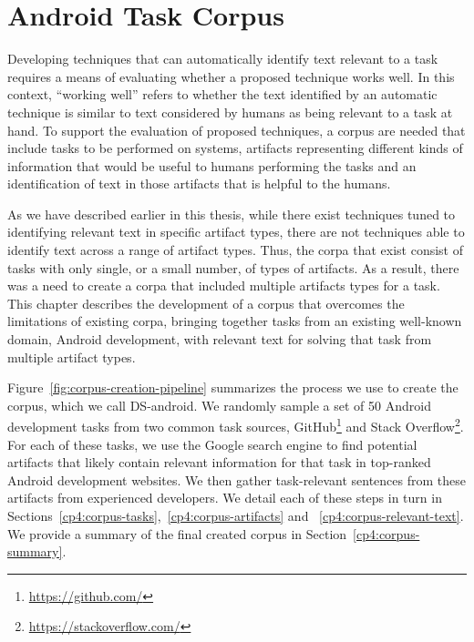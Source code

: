 \setcounter{chapter}{3}
\setcounter{rq}{1}


\chapter{Android Task Corpus}
\label{ch:android-corpus}




Developing techniques that can automatically identify text
relevant to a task requires a means of evaluating whether
a proposed technique works well. In this context,
``working well'' refers to whether the text identified
by an automatic technique is similar to text considered
by humans as being relevant to a task at hand. To support
the evaluation of proposed techniques, a corpus
are needed that include tasks to be performed on
systems, artifacts representing different kinds of information
that would be useful to humans performing the tasks
and an identification of text in those artifacts that
is helpful to the humans.

As we have described earlier in this thesis, while there
exist techniques tuned to identifying relevant text in
specific artifact types, there are not techniques able to
identify text across a range of artifact types. Thus,
the corpa that exist consist of tasks with only single,
or a small number, of types of artifacts. As a result,
there was a need to create a corpa that included
multiple artifacts types for a task. This chapter describes the
development of a corpus that overcomes the limitations of
existing corpa, bringing together tasks from an existing
well-known domain, Android development, with relevant text
for solving that task from multiple artifact types.


Figure~\ref{fig:corpus-creation-pipeline}
summarizes the process we use to create the corpus, which we call \acs{DS-android}.
We randomly sample a set of 50 Android development tasks from two common
task sources, GitHub\footnote{\url{https://github.com/}} and Stack Overflow\footnote{\url{https://stackoverflow.com/}}.
For each of these tasks, we use the Google search engine to find potential artifacts that likely contain relevant
information for that task in top-ranked Android development websites. 
We then gather task-relevant sentences from these artifacts
from experienced developers.
We detail each of these steps in turn in 
Sections~\ref{cp4:corpus-tasks},~\ref{cp4:corpus-artifacts} and ~\ref{cp4:corpus-relevant-text}.
We provide a summary of the final created corpus in Section~\ref{cp4:corpus-summary}.




